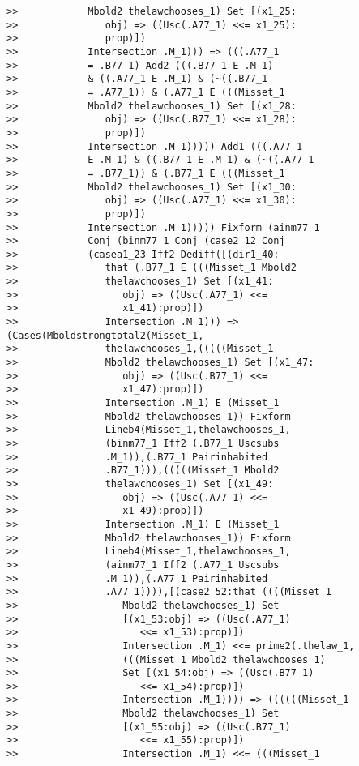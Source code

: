 \documentclass[12pt]{article}
\begin{document}
\begin{verbatim}
>>            Mbold2 thelawchooses_1) Set [(x1_25:
>>               obj) => ((Usc(.A77_1) <<= x1_25):
>>               prop)])
>>            Intersection .M_1))) => (((.A77_1
>>            = .B77_1) Add2 (((.B77_1 E .M_1)
>>            & ((.A77_1 E .M_1) & (~((.B77_1
>>            = .A77_1)) & (.A77_1 E (((Misset_1
>>            Mbold2 thelawchooses_1) Set [(x1_28:
>>               obj) => ((Usc(.B77_1) <<= x1_28):
>>               prop)])
>>            Intersection .M_1))))) Add1 (((.A77_1
>>            E .M_1) & ((.B77_1 E .M_1) & (~((.A77_1
>>            = .B77_1)) & (.B77_1 E (((Misset_1
>>            Mbold2 thelawchooses_1) Set [(x1_30:
>>               obj) => ((Usc(.A77_1) <<= x1_30):
>>               prop)])
>>            Intersection .M_1))))) Fixform (ainm77_1
>>            Conj (binm77_1 Conj (case2_12 Conj
>>            (casea1_23 Iff2 Dediff([(dir1_40:
>>               that (.B77_1 E (((Misset_1 Mbold2
>>               thelawchooses_1) Set [(x1_41:
>>                  obj) => ((Usc(.A77_1) <<=
>>                  x1_41):prop)])
>>               Intersection .M_1))) => (Cases(Mboldstrongtotal2(Misset_1,
>>               thelawchooses_1,(((((Misset_1
>>               Mbold2 thelawchooses_1) Set [(x1_47:
>>                  obj) => ((Usc(.B77_1) <<=
>>                  x1_47):prop)])
>>               Intersection .M_1) E (Misset_1
>>               Mbold2 thelawchooses_1)) Fixform
>>               Lineb4(Misset_1,thelawchooses_1,
>>               (binm77_1 Iff2 (.B77_1 Uscsubs
>>               .M_1)),(.B77_1 Pairinhabited
>>               .B77_1))),(((((Misset_1 Mbold2
>>               thelawchooses_1) Set [(x1_49:
>>                  obj) => ((Usc(.A77_1) <<=
>>                  x1_49):prop)])
>>               Intersection .M_1) E (Misset_1
>>               Mbold2 thelawchooses_1)) Fixform
>>               Lineb4(Misset_1,thelawchooses_1,
>>               (ainm77_1 Iff2 (.A77_1 Uscsubs
>>               .M_1)),(.A77_1 Pairinhabited
>>               .A77_1)))),[(case2_52:that ((((Misset_1
>>                  Mbold2 thelawchooses_1) Set
>>                  [(x1_53:obj) => ((Usc(.A77_1)
>>                     <<= x1_53):prop)])
>>                  Intersection .M_1) <<= prime2(.thelaw_1,
>>                  (((Misset_1 Mbold2 thelawchooses_1)
>>                  Set [(x1_54:obj) => ((Usc(.B77_1)
>>                     <<= x1_54):prop)])
>>                  Intersection .M_1)))) => ((((((Misset_1
>>                  Mbold2 thelawchooses_1) Set
>>                  [(x1_55:obj) => ((Usc(.B77_1)
>>                     <<= x1_55):prop)])
>>                  Intersection .M_1) <<= (((Misset_1

\end{verbatim}
\end{document}
